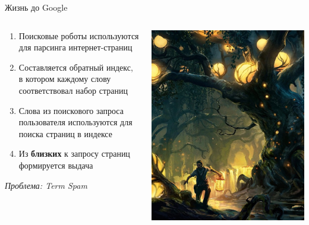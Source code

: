 \documentclass[10pt,a4paper]{beamer}
\begin{document}

\begin{frame}{Жизнь до Google}

\begin{center}

\end{center}
\vspace{-2em}
\begin{columns}[C]
    \begin{column}{.55\textwidth}
    \begin{enumerate}    
	\item Поисковые роботы используются для парсинга интернет-страниц
	\item Составляется обратный индекс, в котором каждому слову соответствовал  набор страниц
	\item Слова из поискового запроса пользователя используются для поиска страниц в индексе
	\item Из {\bf близких} к запросу страниц формируется выдача
	\end{enumerate}
	\vspace{1em}
	{\it \hspace{3em}Проблема: Term Spam}
    \end{column}
    \begin{column}{.55\textwidth}
    \includegraphics[scale=0.24]{images/lantern.png}
	\end{column}
\end{columns}

\end{frame}
\end{document}
